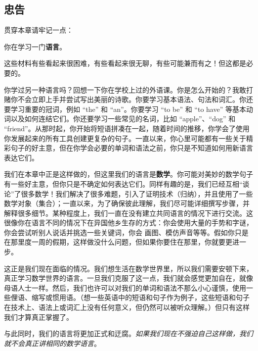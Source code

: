 \subsection{忠告}

贯穿本章请牢记一点：

\begin{center}
    你在学习一门\textbf{语言}。
\end{center}

这些材料有些看起来很困难，有些看起来很无聊，有些可能兼而有之！但这都是必要的。

你学过另一种语言吗？回想一下你在学校上过的外语课。你是怎么开始的？我敢打赌你不会立即上手并尝试写出美丽的诗歌。你要学习基本语法、句法和词汇。你还要学习重要的冠词，例如 ``the'' 和 ``an''。你要学习 ``to be'' 和 ``to have'' 等基本动词以及如何连结它们。你还要学习一些常见的名词，比如 ``apple''、``dog'' 和 ``friend''。从那时起，你开始将短语拼凑在一起，随着时间的推移，你学会了使用你发展起来的所有工具创建更复杂的句子。一直以来，你心里可能都有一些关于精彩句子的好主意，但在你学会必要的单词和语法之前，你只是不知道如何用新语言表达它们。

我们在本章中正是这样做的，但这里我们的语言是\textbf{数学}。你可能对美妙的数学句子有一些好主意，但你只是不确定如何表达它们。同样有趣的是，我们已经互相``谈论''了很多数学！我们解决了很多难题，引入了证明技术（归纳），并且使用了一些数学对象（集合）；一直以来，为了确保彼此理解，我们尽可能详细撰写步骤，并解释很多细节。某种程度上，我们一直在没有建立共同语言的情况下进行交流。这很像你在语言不同的情况下在异国他乡生存的方式：你会使用大量的手势和字谜，你会尝试听别人说话并挑选一些关键词，你会 画图、模仿声音等等。假如你只是在那里度一周的假期，这样做没什么问题，但如果你要住在那里，你就要更进一步。

这正是我们现在面临的情况。我们想生活在数学世界里，所以我们需要安顿下来，真正学习数学世界的语言。一旦我们克服了这一点，我们就会感觉更加自在，就像母语人士一样。然后，我们也许可以对我们的单词和语法不那么小心谨慎，使用一些俚语、缩写或惯用语。（想一些英语中的短语和句子作为例子，这些短语和句子在技术上、语法上或词汇上没有任何意义，但仍然可以被听众理解。）但只有这样我们才算真正掌握了。

与此同时，我们的语言将更加正式和迂腐。\emph{如果我们现在不强迫自己这样做，我们就不会真正讲相同的数学语言}。